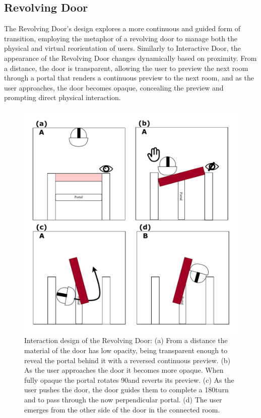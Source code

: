 \subsection{Revolving Door}
\label{sec:rev-door-design}

The Revolving Door's design explores a more continuous and guided form of transition, employing the metaphor of a revolving door to manage both 
the physical and virtual reorientation of users. Similarly to Interactive Door, the appearance of the Revolving Door changes dynamically based 
on proximity. From a distance, the door is transparent, allowing the user to preview the next room through a portal that renders a continuous preview 
to the next room, and as the user approaches, the door becomes opaque, concealing the preview and prompting direct physical interaction.  

\begin{figure}[t]
    \centering
     \includegraphics[width=.6\textwidth]{NOVAthesisFiles/Images/schemes/rev-interaction.pdf}
     \caption[Interaction design of the Revolving Door.]
     {Interaction design of the Revolving Door: (a) From a distance the material of the door has low opacity, being transparent enough to 
     reveal the portal behind it with a reversed continuous preview. (b) As the user approaches the door it becomes more opaque. When fully 
     opaque the portal rotates 90\textdegree and reverts its preview. (c) As the user pushes the door, the door guides them to complete 
     a 180\textdegree turn and to pass through the now perpendicular portal. (d) The user emerges from the other side of the door in the connected 
     room.}
     \label{fig:rev-portal-interaction}
\end{figure}

